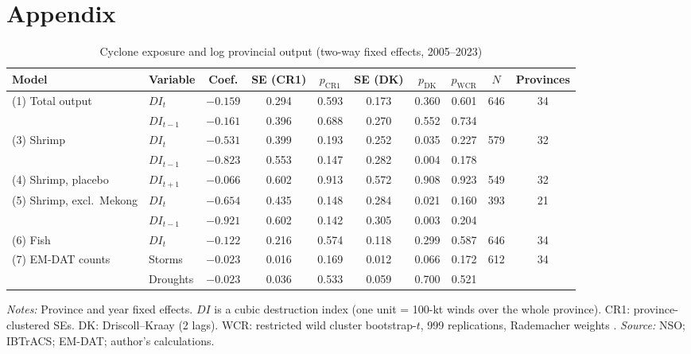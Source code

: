 \documentclass[11pt,a4paper]{article}
\begin{document}
\clearpage
\printbibliography[title={References}]

\clearpage
\appendix
\section*{Appendix}
\renewcommand{\thetable}{A\arabic{table}}
\setcounter{table}{0}

\begin{table}[htbp]
\centering\scriptsize
\caption{Cyclone exposure and log provincial output (two-way fixed effects, 2005--2023)}
\label{tab:twfe}
\begin{tabular}{@{}llcccccccc@{}}
\toprule
Model & Variable & Coef. & SE (CR1) & $p_{\text{CR1}}$ & SE (DK) & $p_{\text{DK}}$ & $p_{\text{WCR}}$ & $N$ & Provinces \\
\midrule
(1) Total output & $DI_t$ & $-0.159$ & 0.294 & 0.593 & 0.173 & 0.360 & 0.601 & 646 & 34 \\
 & $DI_{t-1}$ & $-0.161$ & 0.396 & 0.688 & 0.270 & 0.552 & 0.734 & & \\
(3) Shrimp & $DI_t$ & $-0.531$ & 0.399 & 0.193 & 0.252 & 0.035 & 0.227 & 579 & 32 \\
 & $DI_{t-1}$ & $-0.823$ & 0.553 & 0.147 & 0.282 & 0.004 & 0.178 & & \\
(4) Shrimp, placebo & $DI_{t+1}$ & $-0.066$ & 0.602 & 0.913 & 0.572 & 0.908 & 0.923 & 549 & 32 \\
(5) Shrimp, excl.\ Mekong & $DI_t$ & $-0.654$ & 0.435 & 0.148 & 0.284 & 0.021 & 0.160 & 393 & 21 \\
 & $DI_{t-1}$ & $-0.921$ & 0.602 & 0.142 & 0.305 & 0.003 & 0.204 & & \\
(6) Fish & $DI_t$ & $-0.122$ & 0.216 & 0.574 & 0.118 & 0.299 & 0.587 & 646 & 34 \\
(7) EM-DAT counts & Storms & $-0.023$ & 0.016 & 0.169 & 0.012 & 0.066 & 0.172 & 612 & 34 \\
 & Droughts & $-0.023$ & 0.036 & 0.533 & 0.059 & 0.700 & 0.521 & & \\
\bottomrule
\end{tabular}
\begin{minipage}{\textwidth}\footnotesize
\textit{Notes:} Province and year fixed effects. $DI$ is a cubic destruction index (one unit = 100-kt winds over the whole province). CR1: province-clustered SEs. DK: Driscoll--Kraay (2 lags). WCR: restricted wild cluster bootstrap-$t$, 999 replications, Rademacher weights \parencite{cameron2008,driscoll1998}. \textit{Source:} NSO; IBTrACS; EM-DAT; author's calculations.
\end{minipage}
\end{table}
\end{document}
